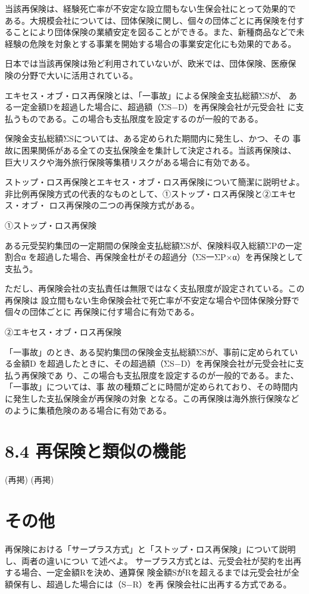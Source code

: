 \documentclass[report,gutter=10mm,fore-edge=10mm,uplatex,dvipdfmx]{jlreq}
\begin{document}
当該再保険は、経験死亡率が不安定な設立間もない生保会社にとって効果的で
ある。大規模会社については、団体保険に関し、個々の団体ごとに再保険を付す
ることにより団体保険の業績安定を図ることができる。また、新種商品などで未
経験の危険を対象とする事業を開始する場合の事業安定化にも効果的である。

日本では当該再保険は殆ど利用されていないが、欧米では、団体保険、医療保
険の分野で大いに活用されている。

エキセス・オブ・ロス再保険とは、「一事故」による保険金支払総額ΣSが、
ある一定金額Dを超過した場合に、超過額（ΣS−D）を再保険会社が元受会社
に支払うものである。この場合も支払限度を設定するのが一般的である。

保険金支払総額ΣSについては、ある定められた期間内に発生し、かつ、その
事故に困果関係がある全ての支払保険金を集計して決定される。当該再保険は、
巨大リスクや海外旅行保険等集積リスクがある場合に有効である。

ストップ・ロス再保険とエキセス・オブ・ロス再保険について簡潔に説明せよ。
\answer{}
非比例再保険方式の代表的なものとして、①ストップ・ロス再保険と②エキセス・オブ・
ロス再保険の二つの再保険方式がある。

\noindent ①ストップ・ロス再保険

ある元受契約集団の一定期間の保険金支払総額ΣSが、保険料収入総額ΣPの一定割合α
を超過した場合、再保険金杜がその超過分（ΣS一ΣP×α）を再保険として支払う。

ただし、再保険会社の支払責任は無限ではなく支払限度が設定されている。この再保険は
設立間もない生命保険会社で死亡率が不安定な場合や団体保険分野で個々の団体ごとに
再保険に付す場合に有効である。

\noindent ②エキセス・オブ・ロス再保険

「一事故」のとき、ある契約集団の保険金支払総額ΣSが、事前に定められている金額D
を超過したときに、その超過額（ΣS−D）を再保険会社が元受会社に支払う再保険であ
り、この場合も支払限度を設定するのが一般的である。また、「一事故」については、事
故の種類ごとに時間が定められており、その時間内に発生した支払保険金が再保険の対象
となる。この再保険は海外旅行保険などのように集積危険のある場合に有効である。

\section{8.4 再保険と類似の機能}
(再掲)
(再掲)

\section{その他}
再保険における「サープラス方式」と「ストップ・ロス再保険」について説明し、両者の違いについ
て述べよ。
\answer{}
サープラス方式とは、元受会社が契約を出再する場合、一定金額Rを決め、通算保
険金額SがRを超えるまでは元受会社が全額保有し、超過した場合には（S−R）を再
保険会社に出再する方式である。
\end{document}
